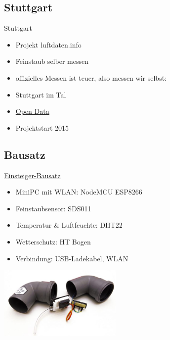 \documentclass[aspectratio=169]{beamer} %
\begin{document}
\subsection{Stuttgart}
\begin{frame}{Stuttgart}
  \begin{itemize}
  \item Projekt luftdaten.info
  \item Feinstaub selber messen
  \item offizielles Messen ist teuer, also messen wir selbst:
  \item Stuttgart im Tal
  \item \href{https://de.wikipedia.org/wiki/Open_Data}{Open Data}
  \item Projektstart 2015
  \end{itemize}
\end{frame}

\subsection{Bausatz}
\begin{frame}{\href{http://luftdaten.info/feinstaubsensor-bauen/}{Einsteiger-Bausatz}}
  \begin{itemize}
  \item MiniPC mit WLAN: NodeMCU ESP8266
  \item Feinstaubsensor: SDS011
  \item Temperatur \& Luftfeuchte: DHT22
  \item Wetterschutz: HT Bogen
  \item Verbindung: USB-Ladekabel, WLAN
  \end{itemize}
  \begin{center}
    \includegraphics[width=6cm]{../screenshots/Feinstaub-Sensor-Bausatz-e1479558693357.jpg}
  \end{center}
\end{frame}
\end{document}

